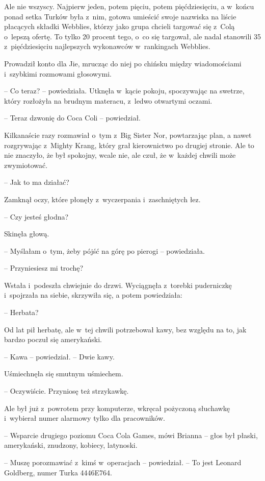 \documentclass[oneside,polish,11pt,rmheadings]{mwbk}
\begin{document}
Ale nie wszyscy. Najpierw jeden, potem pięciu, potem pięćdziesięciu, a w~końcu ponad setka Turków była z~nim, gotowa umieścić swoje nazwiska na liście płacących składki Webblies, którzy jako grupa chcieli targować się z~Colą o~lepszą ofertę. To tylko 20 procent tego, o~co się targował, ale nadal stanowili 35 z~pięćdziesięciu najlepszych wykonawców w~rankingach Webblies.

Prowadził konto dla Jie, mrucząc do niej po chińsku między wiadomościami i~szybkimi rozmowami głosowymi.

-- Co teraz? -- powiedziała. Utknęła w~kącie pokoju, spoczywając na swetrze, który rozłożyła na brudnym materacu, z~ledwo otwartymi oczami.

-- Teraz dzwonię do Coca Coli -- powiedział.

 Kilkanaście razy rozmawiał o~tym z~Big Sister Nor, powtarzając plan, a nawet rozgrywając z~Mighty Krang, który grał kierownictwo po drugiej stronie. Ale to nie znaczyło, że był spokojny, wcale nie, ale czuł, że w~każdej chwili może zwymiotować.

-- Jak to ma działać?

Zamknął oczy, które płonęły z~wyczerpania i~zaschniętych łez. 

-- Czy jesteś głodna? 

Skinęła głową. 

-- Myślałam o~tym, żeby pójść na górę po pierogi -- powiedziała.

-- Przyniesiesz mi trochę? 

Wstała i~podeszła chwiejnie do drzwi. Wyciągnęła z~torebki puderniczkę i~spojrzała na siebie, skrzywiła się, a potem powiedziała: 

-- Herbata?

Od lat pił herbatę, ale w~tej chwili potrzebował kawy, bez względu na to, jak bardzo poczuł się amerykański.

 -- Kawa -- powiedział. -- Dwie kawy.

Uśmiechnęła się smutnym uśmiechem. 

-- Oczywiście. Przyniosę też strzykawkę.

Ale był już z~powrotem przy komputerze, wkręcał pożyczoną słuchawkę i~wybierał numer alarmowy tylko dla pracowników.

-- Wsparcie drugiego poziomu Coca Cola Games, mówi Brianna -- głos był płaski, amerykański, znudzony, kobiecy, latynoski.

-- Muszę porozmawiać z~kimś w~operacjach -- powiedział. -- To jest Leonard Goldberg, numer Turka 4446E764.
\end{document}
